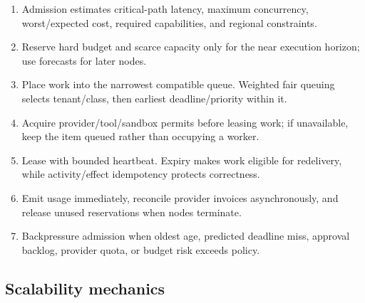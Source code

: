 \begin{enumerate}

\item Admission estimates critical-path latency, maximum concurrency, worst/expected cost, required capabilities, and regional constraints.

\item Reserve hard budget and scarce capacity only for the near execution horizon; use forecasts for later nodes.

\item Place work into the narrowest compatible queue. Weighted fair queuing selects tenant/class, then earliest deadline/priority within it.

\item Acquire provider/tool/sandbox permits before leasing work; if unavailable, keep the item queued rather than occupying a worker.

\item Lease with bounded heartbeat. Expiry makes work eligible for redelivery, while activity/effect idempotency protects correctness.

\item Emit usage immediately, reconcile provider invoices asynchronously, and release unused reservations when nodes terminate.

\item Backpressure admission when oldest age, predicted deadline miss, approval backlog, provider quota, or budget risk exceeds policy.

\end{enumerate}

\subsection{Scalability mechanics}

